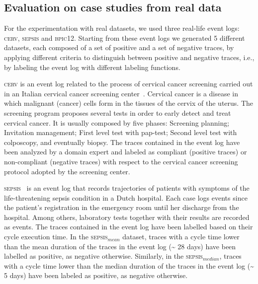 \subsection{Evaluation on case studies from real data}
\label{sec:realdata}


For the experimentation with real datasets, we used three real-life event logs: \textsc{cerv}, \textsc{sepsis} and \textsc{bpic12}. Starting from these event logs we generated 5 different datasets, each composed of a set of positive and a set of negative traces, by applying different criteria to distinguish between positive and negative traces, i.e., by labeling the event log with different labeling functions. 

\textsc{cerv} is an event log related to the process of cervical cancer screening carried out in an Italian cervical cancer screening center~\cite{2007b-Lamma}. Cervical cancer is a disease in which malignant (cancer) cells form in the tissues of the cervix of the uterus. The screening program proposes several tests in order to early detect and treat cervical cancer. It is usually composed by five phases: Screening planning; Invitation management; First level test with pap-test; Second level test with colposcopy, and eventually biopsy. The traces contained in the event log have been analyzed by a domain expert and labeled as compliant (positive traces) or non-compliant (negative traces) with respect to the cervical cancer screening protocol adopted by the screening center.

\textsc{sepsis}~\cite{Sepsis} is an event log that records trajectories of patients with symptoms of the life-threatening sepsis condition in a Dutch hospital.
Each case logs events since the patient’s registration in the emergency room until her discharge from the hospital. Among others, laboratory tests together with their results are recorded as events. The traces contained in the event log have been labelled based on their cycle execution time. In the \textsc{sepsis$_{mean}$} dataset, traces with a cycle time lower than the mean duration of the traces in the event log (\textasciitilde\xspace 28 days) have been labelled as positive, as negative otherwise. Similarly, in the \textsc{sepsis$_{median}$}, traces with a cycle time lower than the median duration of the traces in the event log (\textasciitilde\xspace 5 days)  have been labeled as positive, as negative otherwise.  

